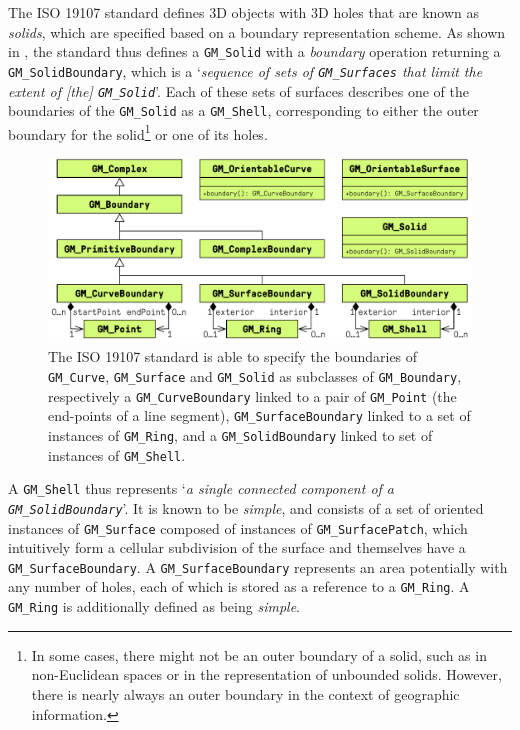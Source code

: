 The ISO 19107 standard \citep[\S{}6.3.18]{ISO19107:2005} defines 3D objects with 3D holes that are known as \emph{solids}, which are specified based on a boundary representation scheme.
As shown in , the standard thus defines a \texttt{GM\_Solid} with a \emph{boundary} operation returning a \texttt{GM\_SolidBoundary}, which is a `\emph{sequence of sets of \texttt{GM\_Surfaces} that limit the extent of [the] \texttt{GM\_Solid}}'.
Each of these sets of surfaces describes one of the boundaries of the \texttt{GM\_Solid} as a \texttt{GM\_Shell}, corresponding to either the outer boundary for the solid\footnote{In some cases, there might not be an outer boundary of a solid, such as in non-Euclidean spaces or in the representation of unbounded solids. However, there is nearly always an outer boundary in the context of geographic information.} or one of its holes.

\begin{figure}[tbp]
\centering
\includegraphics[width=\linewidth]{figs/iso-brep}
\caption[The boundary representation scheme in ISO 19107]{The ISO 19107 standard \citep[\S{}6.3.2]{ISO19107:2005} is able to specify the boundaries of \texttt{GM\_Curve}, \texttt{GM\_Surface} and \texttt{GM\_Solid} as subclasses of \texttt{GM\_Boundary}, respectively a \texttt{GM\_CurveBoundary} linked to a pair of \texttt{GM\_Point} (the end-points of a line segment), \texttt{GM\_SurfaceBoundary} linked to a set of instances of \texttt{GM\_Ring}, and a \texttt{GM\_SolidBoundary} linked to set of instances of \texttt{GM\_Shell}.}
\label{fig:iso-brep}
\end{figure}

A \texttt{GM\_Shell} \citep[\S{}6.3.8]{ISO19107:2005} thus represents `\emph{a single connected component of a \texttt{GM\_SolidBoundary}}'.
It is known to be \emph{simple}, and consists of a set of oriented instances of \texttt{GM\_Surface} composed of instances of \texttt{GM\_SurfacePatch}, which intuitively form a cellular subdivision of the surface and themselves have a \texttt{GM\_SurfaceBoundary}.
A \texttt{GM\_SurfaceBoundary} represents an area potentially with any number of holes, each of which is stored as a reference to a \texttt{GM\_Ring}.
A \texttt{GM\_Ring} \citep[\S{}6.3.6]{ISO19107:2005} is additionally defined as being \emph{simple}.


